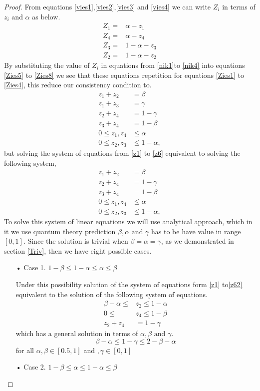 \begin{proof}
From equations \ref{vies1},\ref{vies2},\ref{vies3} and \ref{vies4} we can write $Z_i$ in terms of $z_i$ and $\alpha$ as below.
\begin{align}
Z_1=&\alpha-z_1\label{nik1}\\
Z_4=&\alpha-z_4\label{nik2}\\
Z_3=&1-\alpha-z_3\label{nik3}\\
Z_2=&1-\alpha-z_2\label{nik4}
\end{align}
By substituting the value of $Z_i$ in equations from \ref{nik1}to \ref{nik4} into equations \ref{Zies5} to \ref{Zies8} we see that these equations repetition for equations \ref{Zies1} to \ref{Zies4}, this reduce our consistency condition to.
\begin{align}
z_1+z_2&=\beta\label{z1}\\
z_1+z_3&=\gamma\label{z2}\\
z_2+z_4&=1-\gamma\label{z4}\\
z_3+z_4&=1-\beta\label{z3}\\
0\leq z_1,z_4& \leq \alpha\label{z5}\\
0\leq z_2,z_3 &\leq 1- \alpha\label{z6},
\end{align}
but solving the system of equations from \ref{z1} to \ref{z6} equivalent to solving the following system,
\begin{align}
z_1+z_2&=\beta\label{z1}\\
z_2+z_4&=1-\gamma\label{z42}\\
z_3+z_4&=1-\beta\label{z32}\\
0\leq z_1,z_4& \leq \alpha\label{z52}\\
0\leq z_2,z_3 &\leq 1- \alpha\label{z62},
\end{align}
To solve this system of linear equations we will use analytical approach, which in it we use quantum theory prediction $\beta, \alpha \text{ and } \gamma$ has to be have value in range $[0,1]$.
Since the solution is trivial when $\beta=\alpha=\gamma$, as  we demonstrated in section \ref{Triv}, then we have eight  possible cases.

\begin{itemize}
\item[• Case 1.] $1-\beta \leq 1-\alpha \leq \alpha \leq \beta$

Under this possibility  solution of the system of equations form  \ref{z1} to\ref{z62} equivalent to the solution of the following system of equations.
\begin{align*}
\beta -\alpha\leq &z_2 \leq 1-\alpha\\
0 \leq &z_4 \leq 1-\beta\\
z_2+z_4&=1-\gamma
\end{align*}
which has a general solution in terms of $\alpha,\beta \text{ and } \gamma$.
\begin{equation}\label{zc1}
 \beta -\alpha\leq1-\gamma \leq 2-\beta-\alpha
\end{equation}
for all $\alpha,\beta \in [0.5,1]$ and $, \gamma \in [0,1]$
\item[• Case 2.] $1-\beta \leq \alpha \leq 1-\alpha \leq \beta$


\end{itemize}
\end{proof}
